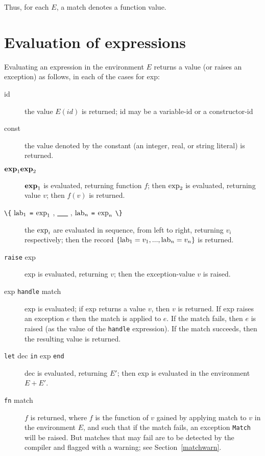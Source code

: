 Thus, for each $E$, a match denotes a function value.

\section{Evaluation of expressions}
Evaluating an expression in the environment $E$ returns a value (or raises an
exception) as follows, in each of the cases for exp:
\begin{description}
\item[id\hfill]  the value $E(id)$ is returned; id may be a variable-id or a
constructor-id
\item[const\hfill]  the value denoted by the constant (an integer, real, or
string literal) is returned.
\item[${\bf exp}_1 {\bf exp}_2$\hfill] ${\bf exp}_1$ is evaluated, 
returning function $f$; then ${\rm exp}_2$
is evaluated, returning value $v$; then $f(v)$ is returned.
\item[\protect\verb"\{" ${\rm lab}_1$ \protect\verb"=" ${\rm exp}_1$ , \underline{\ \ \ } , ${\rm lab}_n$ \protect\verb"=" ${\rm exp}_n$ \protect\verb"\}" \hfill]  
the ${\rm exp}_i$ are evaluated in sequence, from left to right,
returning $v_i$ respectively; then the record 
$\{ {\rm lab}_1 = v_1 , ... , {\rm lab}_n = v_n \}$ is returned.
\item[\protect\verb"raise" exp\hfill]  exp is evaluated, returning $v$; then 
the exception-value $v$ is raised.

\item[exp \verb"handle" match\hfill]  exp is evaluated; if exp returns a
value $v$, then $v$ is returned.  If exp raises an exception $e$ then
the match is applied to $e$.  If the match fails, then $e$ is raised
(as the value of the \verb"handle" expression).  If the match
succeeds, then the resulting value is returned.

\item[\verb"let" dec \verb"in" exp \verb"end"\hfill]  dec is evaluated,
returning $E'$; then exp is evaluated in the environment $E+E'$.

\item[\verb"fn" match\hfill]  $f$ is returned, where $f$ is the function of
$v$ gained by applying match to $v$ in the environment $E$, and such
that if the match fails, an exception \verb"Match" will be raised.
\label{raisematch}
But matches that may fail are to be detected by the
compiler and flagged with a warning; see Section~\ref{matchwarn}.
\end{description}

